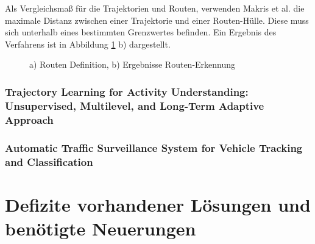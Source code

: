 Als Vergleichsmaß für die Trajektorien und Routen, verwenden Makris et al. die maximale Distanz zwischen einer Trajektorie und
einer Routen-Hülle. Diese muss sich unterhalb eines bestimmten Grenzwertes befinden.
Ein Ergebnis des Verfahrens ist in Abbildung \ref{fig:relw_hu_example_envelope} b) dargestellt.

\begin{figure}[H]
    \centering
    \caption[Routen-Definition und Ergebnisse Routen-Erkennung (Makris et al.)]{a) Routen Definition, b) Ergebnisse Routen-Erkennung \cite[]{Makris2005}}
    \label{fig:relw_hu_example_envelope}
\end{figure}


\subsubsection*{Trajectory Learning for Activity Understanding: Unsupervised, Multilevel, and Long-Term Adaptive Approach}


\subsubsection*{Automatic Traffic Surveillance System for Vehicle Tracking and Classification}


\section{Defizite vorhandener Lösungen und benötigte Neuerungen}
\label{sec:rw_deficites}


